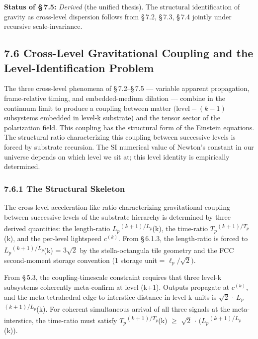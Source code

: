 \documentclass[11pt,oneside]{report}
\theoremstyle{definition}
\theoremstyle{remark}
\begin{document}
\textbf{Status of \S\,7.5:} \emph{Derived} (the unified thesis). The
structural identification of gravity as cross-level dispersion follows
from \S\,7.2, \S\,7.3, \S\,7.4 jointly under recursive scale-invariance.

\subsection*{7.6 Cross-Level Gravitational Coupling and the Level-Identification Problem}

The three cross-level phenomena of \S\,7.2--\S\,7.5 --- variable apparent
propagation, frame-relative timing, and embedded-medium dilation ---
combine in the continuum limit to produce a coupling between matter
\ensuremath{(\text{level}-(k-1)} subsystems embedded in level-k substrate) and the tensor
sector of the polarization field. This coupling has the structural form
of the Einstein equations. The structural ratio characterizing this
coupling between successive levels is forced by substrate recursion. The
SI numerical value of Newton's constant in our universe depends on which
level we sit at; this level identity is empirically determined.

\subsubsection*{7.6.1 The Structural Skeleton}

The cross-level acceleration-like ratio characterizing gravitational
coupling between successive levels of the substrate hierarchy is
determined by three derived quantities: the length-ratio
\ensuremath{L_{p}}\textsuperscript{\ensuremath{(k+1)/L_{p}}}(k), the time-ratio
\ensuremath{T_{p}}\textsuperscript{\ensuremath{(k+1)/T_{p}}}(k), and the per-level lightspeed
\ensuremath{c^{(k)}.} From \S\,6.1.3, the length-ratio is forced to
\ensuremath{L_{p}}\textsuperscript{\ensuremath{(k+1)/L_{p}}}(k) = \ensuremath{3\sqrt{2}} by the stella-octangula tile
geometry and the FCC second-moment storage convention (1 storage unit =
\ensuremath{\ell_{p}/\sqrt{2}).}

From \S\,5.3, the coupling-timescale constraint requires that three level-k
subsystems coherently meta-confirm at level (k+1). Outputs propagate at
\ensuremath{c^{(k)},} and the meta-tetrahedral edge-to-interstice distance in
level-k units is \ensuremath{\sqrt{2}} \ensuremath{\cdot} \ensuremath{L_{p}}\textsuperscript{\ensuremath{(k+1)/L_{p}}}(k). For coherent
simultaneous arrival of all three signals at the meta-interstice, the
time-ratio must satisfy \ensuremath{T_{p}}\textsuperscript{\ensuremath{(k+1)/T_{p}}}(k) \ensuremath{\geq} \ensuremath{\sqrt{2}} \ensuremath{\cdot}
\ensuremath{(L_{p}}\textsuperscript{\ensuremath{(k+1)/L_{p}}}(k)).
\end{document}
